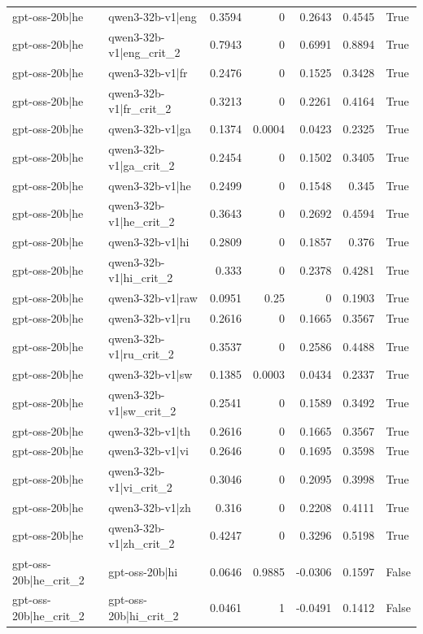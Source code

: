 \begin{table}
\begin{tabular}{l l r r r r l}
gpt-oss-20b|he & qwen3-32b-v1|eng & 0.3594 & 0 & 0.2643 & 0.4545 & True \\
gpt-oss-20b|he & qwen3-32b-v1|eng_crit_2 & 0.7943 & 0 & 0.6991 & 0.8894 & True \\
gpt-oss-20b|he & qwen3-32b-v1|fr & 0.2476 & 0 & 0.1525 & 0.3428 & True \\
gpt-oss-20b|he & qwen3-32b-v1|fr_crit_2 & 0.3213 & 0 & 0.2261 & 0.4164 & True \\
gpt-oss-20b|he & qwen3-32b-v1|ga & 0.1374 & 0.0004 & 0.0423 & 0.2325 & True \\
gpt-oss-20b|he & qwen3-32b-v1|ga_crit_2 & 0.2454 & 0 & 0.1502 & 0.3405 & True \\
gpt-oss-20b|he & qwen3-32b-v1|he & 0.2499 & 0 & 0.1548 & 0.345 & True \\
gpt-oss-20b|he & qwen3-32b-v1|he_crit_2 & 0.3643 & 0 & 0.2692 & 0.4594 & True \\
gpt-oss-20b|he & qwen3-32b-v1|hi & 0.2809 & 0 & 0.1857 & 0.376 & True \\
gpt-oss-20b|he & qwen3-32b-v1|hi_crit_2 & 0.333 & 0 & 0.2378 & 0.4281 & True \\
gpt-oss-20b|he & qwen3-32b-v1|raw & 0.0951 & 0.25 & 0 & 0.1903 & True \\
gpt-oss-20b|he & qwen3-32b-v1|ru & 0.2616 & 0 & 0.1665 & 0.3567 & True \\
gpt-oss-20b|he & qwen3-32b-v1|ru_crit_2 & 0.3537 & 0 & 0.2586 & 0.4488 & True \\
gpt-oss-20b|he & qwen3-32b-v1|sw & 0.1385 & 0.0003 & 0.0434 & 0.2337 & True \\
gpt-oss-20b|he & qwen3-32b-v1|sw_crit_2 & 0.2541 & 0 & 0.1589 & 0.3492 & True \\
gpt-oss-20b|he & qwen3-32b-v1|th & 0.2616 & 0 & 0.1665 & 0.3567 & True \\
gpt-oss-20b|he & qwen3-32b-v1|vi & 0.2646 & 0 & 0.1695 & 0.3598 & True \\
gpt-oss-20b|he & qwen3-32b-v1|vi_crit_2 & 0.3046 & 0 & 0.2095 & 0.3998 & True \\
gpt-oss-20b|he & qwen3-32b-v1|zh & 0.316 & 0 & 0.2208 & 0.4111 & True \\
gpt-oss-20b|he & qwen3-32b-v1|zh_crit_2 & 0.4247 & 0 & 0.3296 & 0.5198 & True \\
gpt-oss-20b|he_crit_2 & gpt-oss-20b|hi & 0.0646 & 0.9885 & -0.0306 & 0.1597 & False \\
gpt-oss-20b|he_crit_2 & gpt-oss-20b|hi_crit_2 & 0.0461 & 1 & -0.0491 & 0.1412 & False \\

\end{tabular}
\end{table}
